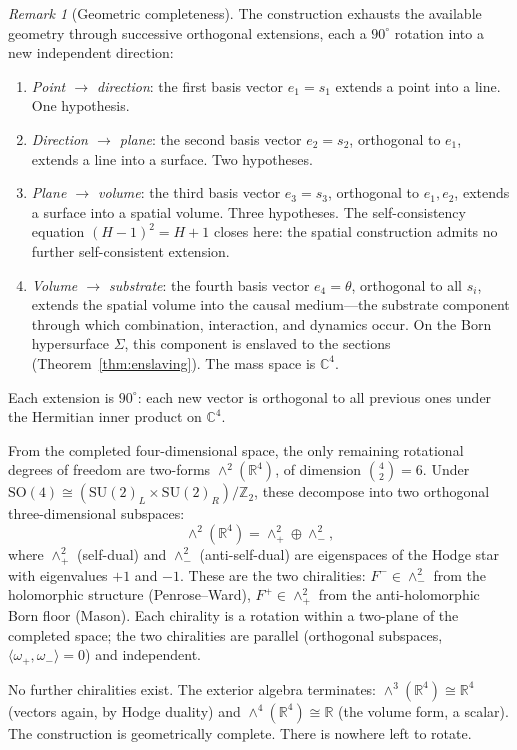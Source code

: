 \documentclass[11pt,a4paper]{article}
\theoremstyle{definition}
\theoremstyle{remark}
\newtheorem{remark}[theorem]{Remark}
\newcommand{\C}{\mathbb{C}}
\newcommand{\R}{\mathbb{R}}
\newcommand{\Z}{\mathbb{Z}}
\newcommand{\SU}{\mathrm{SU}}
\begin{document}
\begin{remark}[Geometric completeness]\label{rem:geometric_completeness}
The construction exhausts the available geometry through successive orthogonal extensions, each a $90^\circ$ rotation into a new independent direction:
\begin{enumerate}[nosep]
\item \emph{Point $\to$ direction}: the first basis vector $e_1=s_1$ extends a point into a line. One hypothesis.
\item \emph{Direction $\to$ plane}: the second basis vector $e_2=s_2$, orthogonal to $e_1$, extends a line into a surface. Two hypotheses.
\item \emph{Plane $\to$ volume}: the third basis vector $e_3=s_3$, orthogonal to $e_1,e_2$, extends a surface into a spatial volume. Three hypotheses. The self-consistency equation $(H-1)^2=H+1$ closes here: the spatial construction admits no further self-consistent extension.
\item \emph{Volume $\to$ substrate}: the fourth basis vector $e_4=\theta$, orthogonal to all $s_i$, extends the spatial volume into the causal medium---the substrate component through which combination, interaction, and dynamics occur. On the Born hypersurface $\Sigma$, this component is enslaved to the sections (Theorem~\ref{thm:enslaving}). The mass space is $\C^4$.
\end{enumerate}

Each extension is $90^\circ$: each new vector is orthogonal to all previous ones under the Hermitian inner product on $\C^4$.

From the completed four-dimensional space, the only remaining rotational degrees of freedom are two-forms $\wedge^2(\R^4)$, of dimension $\binom{4}{2}=6$. Under $\mathrm{SO}(4)\cong(\SU(2)_L\times\SU(2)_R)/\Z_2$, these decompose into two orthogonal three-dimensional subspaces:
\[
\wedge^2(\R^4)=\wedge^2_+\oplus\wedge^2_-,
\]
where $\wedge^2_+$ (self-dual) and $\wedge^2_-$ (anti-self-dual) are eigenspaces of the Hodge star with eigenvalues $+1$ and $-1$. These are the two chiralities: $F^-\in\wedge^2_-$ from the holomorphic structure (Penrose--Ward), $F^+\in\wedge^2_+$ from the anti-holomorphic Born floor (Mason). Each chirality is a rotation within a two-plane of the completed space; the two chiralities are parallel (orthogonal subspaces, $\langle\omega_+,\omega_-\rangle=0$) and independent.

No further chiralities exist. The exterior algebra terminates: $\wedge^3(\R^4)\cong\R^4$ (vectors again, by Hodge duality) and $\wedge^4(\R^4)\cong\R$ (the volume form, a scalar). The construction is geometrically complete. There is nowhere left to rotate.


\end{remark}
\end{document}
